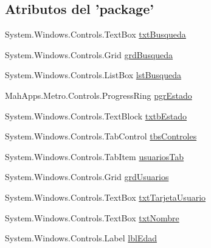 \subsection*{Atributos del 'package'}
\begin{DoxyCompactItemize}
\item 
System.\-Windows.\-Controls.\-Text\-Box \hyperlink{class_proyecto___integrador__3_1_1_reportes_1_1_reporte_frecuencia_de_uso_a6f91eb77ee76d84a4dbf8eaedb2d8497}{txt\-Busqueda}
\item 
System.\-Windows.\-Controls.\-Grid \hyperlink{class_proyecto___integrador__3_1_1_reportes_1_1_reporte_frecuencia_de_uso_af86d8cdcb91a2f6d6954bf44f4ad2b6c}{grd\-Busqueda}
\item 
System.\-Windows.\-Controls.\-List\-Box \hyperlink{class_proyecto___integrador__3_1_1_reportes_1_1_reporte_frecuencia_de_uso_a94c9a9f5043efbb40679b90827da897e}{lst\-Busqueda}
\item 
Mah\-Apps.\-Metro.\-Controls.\-Progress\-Ring \hyperlink{class_proyecto___integrador__3_1_1_reportes_1_1_reporte_frecuencia_de_uso_a40046fa9e14c98adb20dbc8f99f83842}{pgr\-Estado}
\item 
System.\-Windows.\-Controls.\-Text\-Block \hyperlink{class_proyecto___integrador__3_1_1_reportes_1_1_reporte_frecuencia_de_uso_ab5dad4dbd48cba1238ec0914d940c499}{txtb\-Estado}
\item 
System.\-Windows.\-Controls.\-Tab\-Control \hyperlink{class_proyecto___integrador__3_1_1_reportes_1_1_reporte_frecuencia_de_uso_a33854de6395bbc0369295eec9598bba5}{tbs\-Controles}
\item 
System.\-Windows.\-Controls.\-Tab\-Item \hyperlink{class_proyecto___integrador__3_1_1_reportes_1_1_reporte_frecuencia_de_uso_a500d4eea9dad49ea8fb51fadc659b71b}{usuarios\-Tab}
\item 
System.\-Windows.\-Controls.\-Grid \hyperlink{class_proyecto___integrador__3_1_1_reportes_1_1_reporte_frecuencia_de_uso_a559e1b9ac74bc2111e3d7c07400db096}{grd\-Usuarios}
\item 
System.\-Windows.\-Controls.\-Text\-Box \hyperlink{class_proyecto___integrador__3_1_1_reportes_1_1_reporte_frecuencia_de_uso_a2282faf2e30330dc4f45b9bc0264ceaf}{txt\-Tarjeta\-Usuario}
\item 
System.\-Windows.\-Controls.\-Text\-Box \hyperlink{class_proyecto___integrador__3_1_1_reportes_1_1_reporte_frecuencia_de_uso_a801cfb9352eddd0840ad7203a734d5e8}{txt\-Nombre}
\item 
System.\-Windows.\-Controls.\-Label \hyperlink{class_proyecto___integrador__3_1_1_reportes_1_1_reporte_frecuencia_de_uso_aaa51d4046ba0f85ed3aebb8261a30d5e}{lbl\-Edad}

\end{DoxyCompactItemize}
